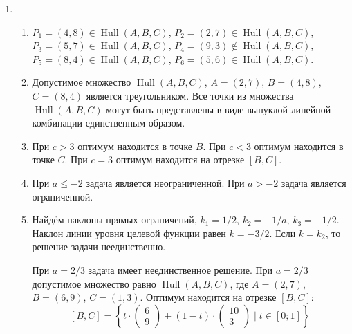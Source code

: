 \documentclass[12pt]{article}
\DeclareMathOperator{\Hull}{Hull}
\DeclareMathOperator{\hull}{\Hull}
\begin{document}
\begin{enumerate}
  \item %
  \begin{enumerate}
    \item $P_1 = (4, 8)  \in \hull(A, B, C)$, $P_2 = (2, 7)  \in \hull(A, B, C)$, 
    $P_3 = (5, 7) \in \hull(A, B, C)$, $P_4 = (9, 3) \notin \hull(A, B, C)$,
    $P_5 = (8, 4) \in \hull(A, B, C)$, $P_6 = (5, 6)  \in \hull(A, B, C)$. 
    \item Допустимое множество $\hull(A, B, C)$, $A = (2, 7)$, $B = (4, 8)$, $C = (8, 4)$  является треугольником. 
    Все точки из множества $\hull(A, B, C)$ могут быть представлены в виде выпуклой линейной комбинации единственным образом. 
    \item При $c > 3$ оптимум находится в точке $B$. 
    При $c < 3$ оптимум находится в точке $C$. 
    При $c = 3$ оптимум находится на отрезке $[B, C]$.
    \item При $a \leq -2$ задача является неограниченной. 
    При $a > -2$ задача является ограниченной. 
    \item Найдём наклоны прямых-ограничений, $k_1 = 1/2$, $k_2 = -1/a$, $k_3 = -1/2$.
    Наклон линии уровня целевой функции равен $k = -3/2$.
    Если $k = k_2$, то решение задачи неединственно.
    
    При $a = 2/3$ задача имеет неединственное решение. 
    При $a = 2/3$ допустимое множество равно $\hull(A, B, C)$, где $A = (2, 7)$, $B = (6, 9)$, $C=(1, 3)$. 
    Оптимум находится на отрезке $[B, C]$:
    \[
    [B, C] =  \left\{  t \cdot \begin{pmatrix}
      6 \\
      9
    \end{pmatrix}  + (1 - t)  \cdot \begin{pmatrix}
      10 \\
      3
    \end{pmatrix}   \mid t \in [0;1] \right\}
    \]


\end{enumerate}
\end{enumerate}
\end{document}

